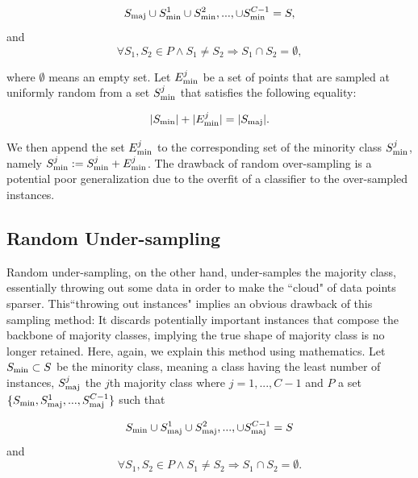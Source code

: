 	\begin{equation}
	S_{\rm{maj}} \cup S_{\rm{min}}^{1} \cup S_{\rm{min}}^{2},..., \cup S_{\rm{min}}^{C-1} = S,
	\end{equation}
	and
	\begin{equation}
	\forall S_1,S_2 \in P \land S_1 \neq S_2 \Rightarrow S_1 \cap S_2 = \emptyset,
	\end{equation}

	
where $\emptyset$ means an empty set. Let $E_{\rm{min}}^j$ be a set of points that are sampled at uniformly random from a set $S_{\rm{min}}^{j}$ that satisfies the following equality:

	\begin{equation}
	|S_{\rm{min}}| + | E_{\rm{min}}^j | = |S_{\rm{maj}}|.
	\end{equation}
	
 We then append the set $E_{\rm{min}}^j$ to the corresponding set of the minority class $S_{\rm{min}}^{j}$, namely $S_{\rm{min}}^{j} := S_{\rm{min}}^{j} + E_{\rm{min}}^j$. The drawback of random over-sampling is a potential poor generalization due to the overfit of a classifier to the over-sampled instances.
	
	\subsection{Random Under-sampling}
	Random under-sampling, on the other hand, under-samples the majority class, essentially throwing out some data in order to make the ``cloud" of data points sparser. This``throwing out instances" implies an obvious drawback of this sampling method: It discards potentially important instances that compose the backbone of majority classes, implying the true shape of majority class is no longer retained. Here, again, we explain this method using mathematics. Let $S_{\rm{min}} \subset S$ be the minority class, meaning a class having the least number of instances, $S_{\rm{maj}}^{j}$ the $j$th majority class where $j = 1,...,C-1$ and $P$ a set $\{S_{\rm{min}}, S_{\rm{maj}}^{1},...,S_{\rm{maj}}^{C-1} \}$ such that

	\begin{equation}
	S_{\rm{min}} \cup S_{\rm{maj}}^{1} \cup S_{\rm{maj}}^{2},..., \cup S_{\rm{maj}}^{C-1} = S
	\end{equation}
	and
	\begin{equation}
	\forall S_1,S_2 \in P \land S_1 \neq S_2 \Rightarrow S_1 \cap S_2 = \emptyset.
	\end{equation}
	
